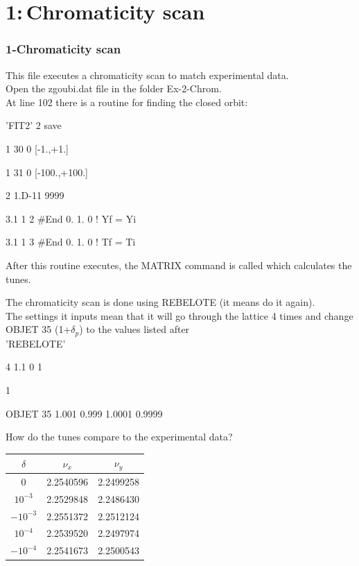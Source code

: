 \documentclass{beamer}
\begin{document}
\section{1:\,Chromaticity scan}
\begin{frame}
\frametitle{1-Chromaticity scan}
This file executes a chromaticity scan to match experimental data.\\
Open the zgoubi.dat file in the folder Ex-2-Chrom.\\
At line 102 there is a routine for finding the closed orbit:
\tiny

 'FIT2'
2  save

1 30 0 [-1.,+1.]

1 31 0 [-100.,+100.]

2  1.D-11  9999

3.1  1  2  \#End 0. 1. 0   ! Yf = Yi

3.1  1  3  \#End 0. 1. 0   ! Tf = Ti

\normalsize
After this routine executes, the MATRIX command is called which calculates the tunes.
\end{frame}
\begin{frame}
The chromaticity scan is done using REBELOTE (it means do it again). \\
The settings it inputs mean that it will go through the lattice 4 times and change OBJET 35 (1+$\delta_p$) to the values listed after\\
\tiny
 'REBELOTE'

4 1.1 0 1

1

OBJET 35  1.001  0.999  1.0001  0.9999

\normalsize
How do the tunes compare to the experimental data?\\
\begin{center}
\begin{tabular}{ccc}
$\delta$  &$\nu_x$  &$\nu_y$\\
\hline
0		  &2.2540596&2.2499258\\
$10^{-3}$ &2.2529848&2.2486430\\
$-10^{-3}$&2.2551372&2.2512124\\
$10^{-4}$ &2.2539520&2.2497974\\
$-10^{-4}$&2.2541673&2.2500543\\
\end{tabular}
\end{center}
\end{frame}
\end{document}
